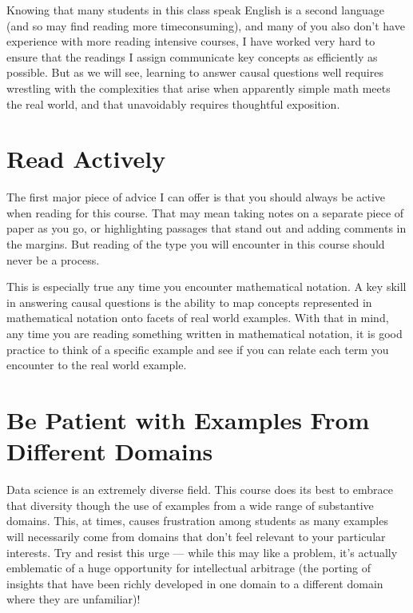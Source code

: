 \documentclass[letterpaper,10pt,english]{jupyterBook}
\begin{document}
\sphinxAtStartPar
Knowing that many students in this class speak English is a second language (and so may find reading more time\sphinxhyphen{}consuming), and many of you also don’t have experience with more reading intensive courses, I have worked very hard to ensure that the readings I assign communicate key concepts as efficiently as possible. But as we will see, learning to answer causal questions well requires wrestling with the complexities that arise when apparently simple math meets the real world, and that unavoidably requires thoughtful exposition.


\section{Read Actively}
\label{\detokenize{40_in_practice/00_how_to_read_this_book:read-actively}}
\sphinxAtStartPar
The first major piece of advice I can offer is that you should always be active when reading for this course. That may mean taking notes on a separate piece of paper as you go, or highlighting passages that stand out and adding comments in the margins. But reading of the type you will encounter in this course should never be a  process.

\sphinxAtStartPar
This is especially true any time you encounter mathematical notation. A key skill in answering causal questions is the ability to map concepts represented in mathematical notation onto facets of real world examples. With that in mind, any time you are reading something written in mathematical notation, it is good practice to think of a specific example and see if you can relate each term you encounter to the real world example.


\section{Be Patient with Examples From Different Domains}
\label{\detokenize{40_in_practice/00_how_to_read_this_book:be-patient-with-examples-from-different-domains}}
\sphinxAtStartPar
Data science is an extremely diverse field. This course does its best to embrace that diversity though the use of examples from a wide range of substantive domains. This, at times, causes frustration among students as many examples will necessarily come from domains that don’t feel relevant to your particular interests. Try and resist this urge — while this may  like a problem, it’s actually emblematic of a huge opportunity for intellectual arbitrage (the porting of insights that have been richly developed in one domain to a different domain where they are unfamiliar)!
\end{document}
